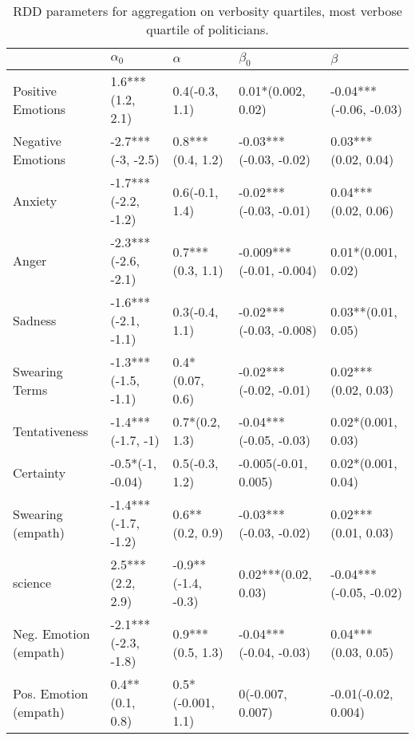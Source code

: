 \begin{table}[h]\centering
\begin{adjustbox}{width=\linewidth, center}
	\begin{tabular}{lllll}
	\toprule
	{} &           $\alpha_0$ &            $\alpha$ &                 $\beta_0$ &                 $\beta$ \\
	\midrule
	Positive Emotions     &     1.6***(1.2, 2.1) &      0.4(-0.3, 1.1) &        0.01*(0.002, 0.02) &  -0.04***(-0.06, -0.03) \\
	Negative Emotions     &    -2.7***(-3, -2.5) &    0.8***(0.4, 1.2) &    -0.03***(-0.03, -0.02) &     0.03***(0.02, 0.04) \\
	Anxiety               &  -1.7***(-2.2, -1.2) &      0.6(-0.1, 1.4) &    -0.02***(-0.03, -0.01) &     0.04***(0.02, 0.06) \\
	Anger                 &  -2.3***(-2.6, -2.1) &    0.7***(0.3, 1.1) &  -0.009***(-0.01, -0.004) &      0.01*(0.001, 0.02) \\
	Sadness               &  -1.6***(-2.1, -1.1) &      0.3(-0.4, 1.1) &   -0.02***(-0.03, -0.008) &      0.03**(0.01, 0.05) \\
	Swearing Terms        &  -1.3***(-1.5, -1.1) &     0.4*(0.07, 0.6) &    -0.02***(-0.02, -0.01) &     0.02***(0.02, 0.03) \\
	Tentativeness         &    -1.4***(-1.7, -1) &      0.7*(0.2, 1.3) &    -0.04***(-0.05, -0.03) &      0.02*(0.001, 0.03) \\
	Certainty             &     -0.5*(-1, -0.04) &      0.5(-0.3, 1.2) &      -0.005(-0.01, 0.005) &      0.02*(0.001, 0.04) \\
	Swearing (empath)     &  -1.4***(-1.7, -1.2) &     0.6**(0.2, 0.9) &    -0.03***(-0.03, -0.02) &     0.02***(0.01, 0.03) \\
	science               &     2.5***(2.2, 2.9) &  -0.9**(-1.4, -0.3) &       0.02***(0.02, 0.03) &  -0.04***(-0.05, -0.02) \\
	Neg. Emotion (empath) &  -2.1***(-2.3, -1.8) &    0.9***(0.5, 1.3) &    -0.04***(-0.04, -0.03) &     0.04***(0.03, 0.05) \\
	Pos. Emotion (empath) &      0.4**(0.1, 0.8) &   0.5*(-0.001, 1.1) &          0(-0.007, 0.007) &     -0.01(-0.02, 0.004) \\
	\bottomrule
	\end{tabular}
	
\end{adjustbox}
	\caption{RDD parameters for aggregation on verbosity quartiles, most verbose quartile of politicians.}
	\label{fig: Verbosity_1}
\end{table}

